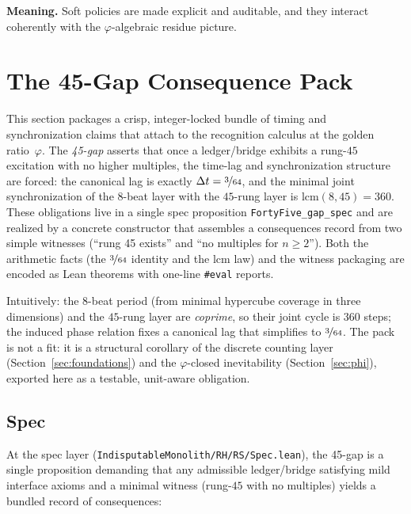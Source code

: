 \documentclass[11pt,a4paper,twoside]{article}
\numberwithin{equation}{section}
\newcommand{\phigr}{\varphi} %
\theoremstyle{customthm}
\theoremstyle{customdef}
\theoremstyle{customrem}
\begin{document}
\textbf{Meaning.} Soft policies are made explicit and auditable, and they interact coherently with the $\phigr$-algebraic residue picture.

\section{The 45-Gap Consequence Pack}\label{sec:gap45}

This section packages a crisp, integer-locked bundle of timing and synchronization claims that attach to the recognition calculus at the golden ratio~$\varphi$. The \emph{45-gap} asserts that once a ledger/bridge exhibits a rung-$45$ excitation with no higher multiples, the time-lag and synchronization structure are forced: the canonical lag is exactly $\Delta t = \nicefrac{3}{64}$, and the minimal joint synchronization of the $8$-beat layer with the $45$-rung layer is $\mathrm{lcm}(8,45)=360$. These obligations live in a single spec proposition \texttt{FortyFive\_gap\_spec} and are realized by a concrete constructor that assembles a consequences record from two simple witnesses (``rung 45 exists'' and ``no multiples for $n\ge 2$''). Both the arithmetic facts (the $\nicefrac{3}{64}$ identity and the $\mathrm{lcm}$ law) and the witness packaging are encoded as Lean theorems with one-line \texttt{\#eval} reports.

Intuitively: the $8$-beat period (from minimal hypercube coverage in three dimensions) and the $45$-rung layer are \emph{coprime}, so their joint cycle is $360$ steps; the induced phase relation fixes a canonical lag that simplifies to $\nicefrac{3}{64}$. The pack is not a fit: it is a structural corollary of the discrete counting layer (Section~\ref{sec:foundations}) and the $\varphi$-closed inevitability (Section~\ref{sec:phi}), exported here as a testable, unit-aware obligation.

\subsection{Spec}\label{subsec:gap45-spec}

At the spec layer (\texttt{IndisputableMonolith/RH/RS/Spec.lean}), the 45-gap is a single proposition demanding that any admissible ledger/bridge satisfying mild interface axioms and a minimal witness (rung-$45$ with no multiples) yields a bundled record of consequences:
\end{document}
